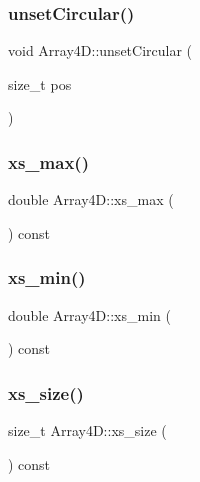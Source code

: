 \subsubsection{\texorpdfstring{unset\+Circular()}{unsetCircular()}}
{\footnotesize\ttfamily void Array4\+D\+::unset\+Circular (\begin{DoxyParamCaption}\item[{size\+\_\+t}]{pos }\end{DoxyParamCaption})}

\mbox{\label{class_array4_d_a4668c9767181db6bd228e054a3f81696}} 
\subsubsection{\texorpdfstring{xs\+\_\+max()}{xs\_max()}}
{\footnotesize\ttfamily double Array4\+D\+::xs\+\_\+max (\begin{DoxyParamCaption}{ }\end{DoxyParamCaption}) const}

\mbox{\label{class_array4_d_a642efdce56ea7ffaf7e24ed1d63b3151}} 
\subsubsection{\texorpdfstring{xs\+\_\+min()}{xs\_min()}}
{\footnotesize\ttfamily double Array4\+D\+::xs\+\_\+min (\begin{DoxyParamCaption}{ }\end{DoxyParamCaption}) const}

\mbox{\label{class_array4_d_a440c545fcf694923767581f590d808df}} 
\subsubsection{\texorpdfstring{xs\+\_\+size()}{xs\_size()}}
{\footnotesize\ttfamily size\+\_\+t Array4\+D\+::xs\+\_\+size (\begin{DoxyParamCaption}{ }\end{DoxyParamCaption}) const}

\mbox{\label{class_array4_d_a1e142285afbb8b00662d8f77f0b92b80}} 
